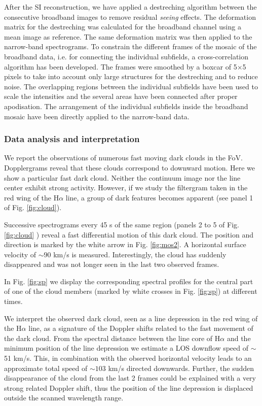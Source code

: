 After the SI reconstruction, we have applied a destreching algorithm between the consecutive broadband images to remove residual \emph{seeing} effects. The deformation matrix for the destreching was calculated for the broadband channel using a mean image as reference. The same deformation matrix was then applied to the narrow-band spectrograms. To constrain the different frames of the mosaic of the broadband data, i.e. for connecting the individual subfields, a cross-correlation algorithm has been developed. The frames were smoothed by a boxcar of 5$\times$5 pixels to take into account only large structures for the destreching and to reduce noise. The overlapping regions between the individual subfields have been used to scale the intensities and the several areas have been connected after proper apodisation. The arrangement of the individual subfields inside the broadband mosaic have been directly applied to the narrow-band data. 

\subsubsection*{Data analysis and interpretation}
We report the observations of numerous fast moving dark clouds in the FoV. Dopplergrams reveal that these clouds correspond to downward motion. Here we show  a particular fast dark cloud. Neither the continuum image nor the line center exhibit strong activity. However, if we study the filtergram taken in the red wing of the H$\alpha$ line, a group of dark features becomes apparent (see panel 1 of Fig. \ref{fig:cloud}). 


Successive spectrograms every 45 s of the same region (panels 2 to 5 of Fig. \ref{fig:cloud} ) reveal a fast differential motion of this dark cloud. The position and direction is marked by the white arrow in Fig. \ref{fig:mos2}. A horizontal surface velocity of $\sim90$ km/s is measured. Interestingly, the cloud has suddenly disappeared and was not longer seen in the last two observed frames.

In Fig. \ref{fig:sp} we display the corresponding spectral profiles for the central part of one of the cloud members (marked by white crosses in Fig. \ref{fig:sp}) at different times. 

We interpret the observed dark cloud, seen as a line depression in the red wing of the H$\alpha$ line, as a signature of the Doppler shifts related to the fast movement of the dark cloud. From the spectral distance between the line core of H$\alpha$ and the minimum position of the line depression we estimate a LOS downflow speed of $\sim$\,51 km/s. This, in combination with the observed horizontal velocity leads to an approximate total speed of $\sim103$ km/s directed downwards.  Further, the sudden disappearance of the cloud from the last 2 frames could be explained with a very strong related Doppler shift, thus the position of the line depression is displaced outside the scanned wavelength range.  


